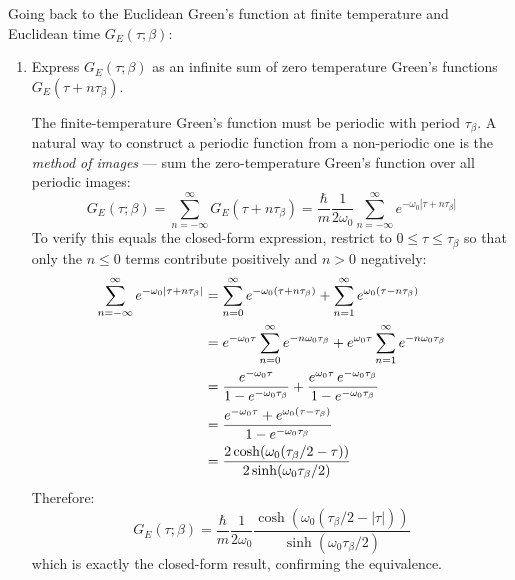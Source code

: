     Going back to the Euclidean Green's function at finite temperature and Euclidean time $G_E(\tau;\beta)$:
    
    \begin{enumerate}[label=\alph*), resume]
    
        \item Express $G_E(\tau;\beta)$ as an infinite sum of zero temperature Green's functions $G_E(\tau + n\tau_\beta)$.
        \begin{solution}
    The finite-temperature Green's function must be periodic with period $\tau_\beta$. 
    A natural way to construct a periodic function from a non-periodic one is the 
    \textit{method of images} — sum the zero-temperature Green's function over all 
    periodic images:
    \begin{equation}
        G_E(\tau;\beta) = \sum_{n=-\infty}^{\infty} G_E(\tau + n\tau_\beta)
        = \frac{\hbar}{m}\frac{1}{2\omega_0}
        \sum_{n=-\infty}^{\infty} e^{-\omega_0|\tau + n\tau_\beta|}
    \end{equation}
    To verify this equals the closed-form expression, restrict to $0\leq\tau\leq\tau_\beta$ 
    so that only the $n\leq 0$ terms contribute positively and $n>0$ negatively:
    \begin{align}
        \sum_{n=-\infty}^{\infty} e^{-\omega_0|\tau+n\tau_\beta|}
        &= \sum_{n=0}^{\infty} e^{-\omega_0(\tau+n\tau_\beta)}
         + \sum_{n=1}^{\infty} e^{\omega_0(\tau-n\tau_\beta)} \notag\\
        &= e^{-\omega_0\tau}\sum_{n=0}^{\infty} e^{-n\omega_0\tau_\beta}
         + e^{\omega_0\tau}\sum_{n=1}^{\infty} e^{-n\omega_0\tau_\beta} \notag\\
        &= \frac{e^{-\omega_0\tau}}{1-e^{-\omega_0\tau_\beta}}
         + \frac{e^{\omega_0\tau}\,e^{-\omega_0\tau_\beta}}{1-e^{-\omega_0\tau_\beta}} \notag\\
        &= \frac{e^{-\omega_0\tau} + e^{\omega_0(\tau-\tau_\beta)}}{1-e^{-\omega_0\tau_\beta}}\notag\\
         &= \frac{2\cosh(\omega_0(\tau_\beta/2-\tau))}{2\sinh(\omega_0\tau_\beta/2)}
    \end{align}
    Therefore:
    \begin{equation}
        G_E(\tau;\beta) = \frac{\hbar}{m}\frac{1}{2\omega_0}
        \frac{\cosh\!\left(\omega_0(\tau_\beta/2-|\tau|)\right)}
             {\sinh\!\left(\omega_0\tau_\beta/2\right)}
    \end{equation}
    which is exactly the closed-form result, confirming the equivalence.
    \end{solution}
    

\end{enumerate}
